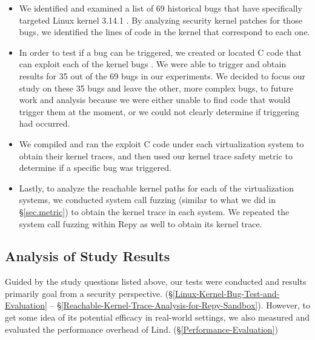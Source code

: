 \begin{itemize}
\item We identified and examined a list of  69 historical bugs that have
specifically
targeted Linux kernel 3.14.1 \cite{CVE-Datasource}. By analyzing
security kernel patches for those bugs,
we identified the lines of code in the kernel that correspond to each
one.

\item In order to test if a bug can be triggered, we created or located C
code that can exploit each of the kernel bugs \cite{Exploit-Database}.
We were able to trigger and obtain results for
35 out of the 69 bugs in our experiments. We decided to focus our study on these
35 bugs and leave the other, more complex bugs, to future work and analysis
because we were either unable to find code that would trigger them at the moment,
or we could not clearly determine if triggering had occurred. 

\item We compiled and ran the exploit C code under each virtualization
system to
obtain their kernel traces, and then used our kernel trace safety metric to
determine
if a specific bug was triggered.

\item Lastly, to analyze the reachable kernel paths for each of the
virtualization systems,
we conducted system call fuzzing (similar to what we did in \S{\ref{sec.metric}}) to obtain
the kernel trace in each system.
We repeated the system call fuzzing within Repy as well to obtain its
kernel trace.
\end{itemize}

\subsection{Analysis of Study Results}

Guided by the study questions listed above, our tests were conducted and results
primarily goal from a security perspective.
(\S{\ref{Linux-Kernel-Bug-Test-and-Evaluation}} --
\S{\ref{Reachable-Kernel-Trace-Analysis-for-Repy-Sandbox}}).
However, to get some idea of its potential efficacy
in real-world settings, we also measured and evaluated the performance
overhead of Lind.
(\S{\ref{Performance-Evaluation}})

